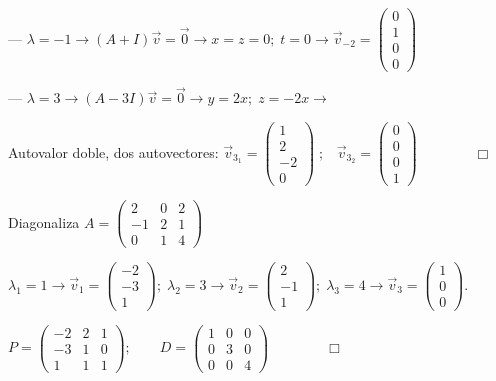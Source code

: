 \noindent --- $\lambda = -1 \to (A+I)\vec v=\vec 0 \to x=z=0; \; t=0 \to \vec v_{-2}= \left( \begin{matrix} 0\\1\\0\\0 \end{matrix} \right)$

\noindent --- $\lambda = 3 \to (A-3I)\vec v=\vec 0 \to y=2x; \; z=-2x \to $

\noindent Autovalor doble, dos autovectores: $\vec v_{3_1}= \left( \begin{matrix} 1\\2\\-2\\0 \end{matrix} \right)\;; \; \;\;  \vec v_{3_2}= \left( \begin{matrix} 0\\0\\0\\1 \end{matrix} \right)$$\qquad \qquad \Box$



\begin{miejercicio}
	Diagonaliza $A=\left(\begin{matrix} 2&0&2\\-1&2&1\\0&1&4  \end{matrix}\right)$
\end{miejercicio}



\noindent \small{$ \lambda_1=1 \longrightarrow \vec v_1=\left( \begin{matrix} -2\\-3\\1 \end{matrix}\right); \; \lambda_2=3 \longrightarrow \vec v_2=\left( \begin{matrix} 2\\-1\\1 \end{matrix}\right); \;\lambda_3=4 \longrightarrow \vec v_3=\left( \begin{matrix} 1\\0\\0 \end{matrix}\right)$}\normalsize{.}

$P=\left(\begin{matrix} -2&2&1\\-3&1&0\\1&1&1  \end{matrix}\right); \qquad D=\left(\begin{matrix} 1&0&0\\0&3&0\\0&0&4  \end{matrix}\right)$$\qquad \qquad \Box$


